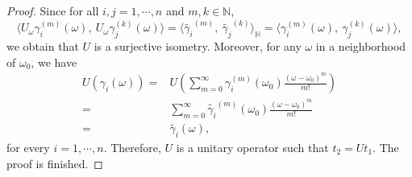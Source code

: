 \documentclass[pdflatex,sn-mathphys-num]{sn-jnl}%
\theoremstyle{thmstyleone}%
\theoremstyle{thmstyletwo}%
\theoremstyle{thmstylethree}%
\theoremstyle{definition}
\theoremstyle{remark}
\begin{document}
\begin{proof}
Since for all $i, j=1,\cdots,n$ and $m,k\in\mathbb{N}$,
    \[
    \langle U_{\omega}\gamma_i^{(m)}(\omega),\ U_{\omega}\gamma_j^{(k)}(\omega)\rangle=\langle\widetilde{\gamma_i}^{(m)}, \ \widetilde{\gamma_j}^{(k)}\rangle_{\mathbb{H}}=\langle\gamma_i^{(m)}(\omega),\ \gamma_j^{(k)}(\omega)\rangle,
    \]
 we obtain that $U$ is a surjective isometry. Moreover,  for any $\omega$ in a neighborhood of $\omega_0$, we have
    \[
    \begin{aligned}
     U(\gamma_i(\omega))
     = & U(\sum_{m=0}^{\infty}\gamma_i^{(m)}(\omega_0)\frac{(\omega-\omega_0)^{m}}{m!}) \\
     = & \sum_{m=0}^{\infty}\widetilde{\gamma_i}^{(m)}(\omega_0)\frac{(\omega-\omega_0)^{m}}{m!} \\
     = & \widetilde{\gamma_i}(\omega),
    \end{aligned}
\]
for every $i=1,\cdots,n$. Therefore, $U$ is a unitary operator such that $t_2=Ut_1$. The proof is finished.
    \end{proof}
\end{document}
